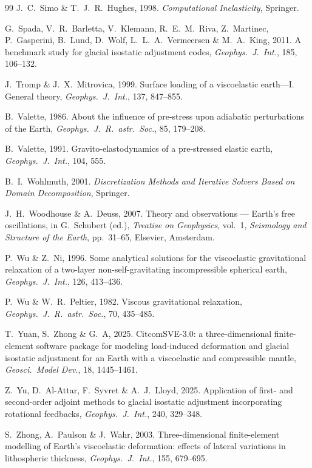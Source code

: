 \documentclass[11pt]{article}
\numberwithin{equation}{section}
\theoremstyle{remark}
\begin{document}
\begin{thebibliography}{99}
J.~C.~Simo \& T.~J.~R.~Hughes, 1998.
\emph{Computational Inelasticity}, Springer.

G.~Spada, V.~R.~Barletta, V.~Klemann, R.~E.~M.~Riva, Z.~Martinec,
P.~Gasperini, B.~Lund, D.~Wolf, L.~L.~A.~Vermeersen \& M.~A.~King, 2011.
A benchmark study for glacial isostatic adjustment codes,
\emph{Geophys.\ J.\ Int.}, 185, 106--132.

J.~Tromp \& J.~X.~Mitrovica, 1999.
Surface loading of a viscoelastic earth---I. General theory,
\emph{Geophys.\ J.\ Int.}, 137, 847--855.

B.~Valette, 1986.
About the influence of pre-stress upon adiabatic perturbations of the
Earth, \emph{Geophys.\ J.\ R.\ astr.\ Soc.}, 85, 179--208.

B.~Valette, 1991.
Gravito-elastodynamics of a pre-stressed elastic earth,
\emph{Geophys.\ J.\ Int.}, 104, 555.

B.~I.~Wohlmuth, 2001.
\emph{Discretization Methods and Iterative Solvers Based on Domain
Decomposition}, Springer.

J.~H.~Woodhouse \& A.~Deuss, 2007.
Theory and observations --- Earth's free oscillations, in
G.~Schubert (ed.), \emph{Treatise on Geophysics}, vol.~1, \emph{Seismology
and Structure of the Earth}, pp.~31--65, Elsevier, Amsterdam.

P.~Wu \& Z.~Ni, 1996.
Some analytical solutions for the viscoelastic gravitational relaxation of
a two-layer non-self-gravitating incompressible spherical earth,
\emph{Geophys.\ J.\ Int.}, 126, 413--436.

P.~Wu \& W.~R.~Peltier, 1982.
Viscous gravitational relaxation, \emph{Geophys.\ J.\ R.\ astr.\ Soc.}, 70,
435--485.

T.~Yuan, S.~Zhong \& G.~A, 2025.
CitcomSVE-3.0: a three-dimensional finite-element software package for
modeling load-induced deformation and glacial isostatic adjustment for an
Earth with a viscoelastic and compressible mantle,
\emph{Geosci.\ Model Dev.}, 18, 1445--1461.

Z.~Yu, D.~Al-Attar, F.~Syvret \& A.~J.~Lloyd, 2025.
Application of first- and second-order adjoint methods to glacial isostatic
adjustment incorporating rotational feedbacks,
\emph{Geophys.\ J.\ Int.}, 240, 329--348.

S.~Zhong, A.~Paulson \& J.~Wahr, 2003.
Three-dimensional finite-element modelling of Earth's viscoelastic
deformation: effects of lateral variations in lithospheric thickness,
\emph{Geophys.\ J.\ Int.}, 155, 679--695.

\end{thebibliography}
\end{document}

